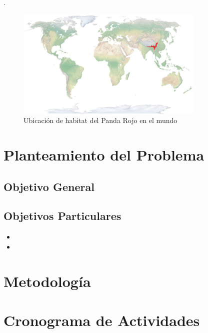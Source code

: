 \documentclass[10pt,letterpaper]{report}
\begin{document}
\lipsum[1-6] \cite{Ellinidou2019}.
\begin{figure}[h]
	\centering
	\includegraphics[width=0.80\textwidth]{Figuras/territorio.jpg}\par\vspace{1cm}
	\caption{Ubicación de habitat del Panda Rojo en el mundo}
	\label{ubicacion}
\end{figure}	

\chapter{Planteamiento del Problema}

\lipsum[1-6]

\section{Objetivo General}
\lipsum[1]
\section{Objetivos Particulares}
\begin{itemize}
    \item \lipsum[1]
    \item \lipsum[1]
\end{itemize}

\chapter{Metodología}

\lipsum[1-4]

\chapter{Cronograma de Actividades}

\lipsum[1-3]

\pagebreak
\end{document}
